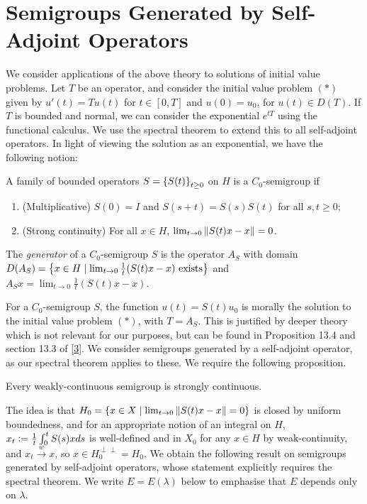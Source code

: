 \documentclass[10pt]{amsart}
\begin{document}
\section{Semigroups Generated by Self-Adjoint Operators}
We consider applications of the above theory to solutions of initial value problems. Let $T$ be an operator, and consider the initial value problem $(*)$ given by $u'(t) = Tu(t)$ for $t \in [0, T]$ and $u(0) = u_0$, for $u(t) \in D(T)$. If $T$ is bounded and normal, we can consider the exponential $e^{tT}$ using the functional calculus. We use the spectral theorem to extend this to all self-adjoint operators. In light of viewing the solution as an exponential, we have the following notion:
\begin{definition}
    A family of bounded operators $S = \left\{  S(t)  \right\}_{t \geq 0}$ on $H$ is a $C_0$-semigroup if
    \begin{enumerate}
        \item (Multiplicative) $S(0) = I$ and $S(s + t) = S(s)S(t)$ for all $s, t \geq 0$;
        \item (Strong continuity) For all $x \in H$, $\lim_{t \to 0}\left\| S(t)x - x \right\| = 0$.
    \end{enumerate} 
    The \emph{generator} of a $C_0$-semigroup $S$ is the operator $A_S$ with domain $D(A_S) = \left\{  x \in H \mid \lim_{t \to 0}\frac1t(S(t)x - x) \text{ exists}  \right\}$ and $A_Sx = \lim_{t \to 0}\frac1t(S(t)x - x)$.
\end{definition}
For a $C_0$-semigroup $S$, the function $u(t) = S(t)u_0$ is morally the solution to the initial value problem $(*)$, with $T = A_S$. This is justified by deeper theory which is not relevant for our purposes, but can be found in Proposition 13.4 and section 13.3 of \hyperlink{jvn}{[3]}. We consider semigroups generated by a self-adjoint operator, as our spectral theorem applies to these. We require the following proposition.
\begin{proposition}
    Every weakly-continuous semigroup is strongly continuous.
\end{proposition}
The idea is that $H_0 = \left\{  x \in X \mid \lim_{t \to 0} \left\| S(t)x - x \right\| = 0  \right\}$ is closed by uniform boundedness, and for an appropriate notion of an integral on $H$, $x_t \vcentcolon= \frac1t\int_0^tS(s)xds$ is well-defined and in $X_0$ for any $x \in H$ by weak-continuity, and $x_t \xrightarrow{w} x$, so $x \in H_0^{\perp\perp} = H_0$. We obtain the following result on semigroups generated by self-adjoint operators, whose statement explicitly requires the spectral theorem. We write $E = E(\lambda)$ below to emphasise that $E$ depends only on $\lambda$.
\end{document}
